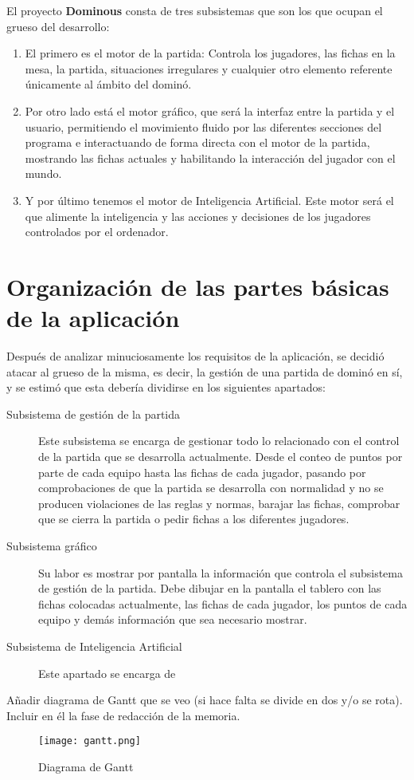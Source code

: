 El proyecto \textbf{Dominous} consta de tres subsistemas que son los que ocupan el grueso del desarrollo:
\begin{enumerate}
    \item El primero es el motor de la partida: Controla los jugadores, las fichas en la mesa, la partida, situaciones irregulares
            y cualquier otro elemento referente únicamente al ámbito del dominó.
    \item Por otro lado está el motor gráfico, que será la interfaz entre la partida y el usuario, permitiendo el movimiento
            fluido por las diferentes secciones del programa e interactuando de forma directa con el motor de la partida,
            mostrando las fichas actuales y habilitando la interacción del jugador con el mundo.
    \item Y por último tenemos el motor de Inteligencia Artificial. Este motor será el que alimente la inteligencia
            y las acciones y decisiones de los jugadores controlados por el ordenador.
\end{enumerate}

\section{Organización de las partes básicas de la aplicación}

Después de analizar minuciosamente los requisitos de la aplicación, se decidió atacar al grueso de la misma,
es decir, la gestión de una partida de dominó en sí, y se estimó que esta debería dividirse en los siguientes
apartados:
\begin{description}
    \item[Subsistema de gestión de la partida] Este subsistema se encarga de gestionar todo lo relacionado
            con el control de la partida que se desarrolla actualmente. Desde el conteo de puntos por parte
            de cada equipo hasta las fichas de cada jugador, pasando por comprobaciones de que la partida
            se desarrolla con normalidad y no se producen violaciones de las reglas y normas, barajar las
            fichas, comprobar que se cierra la partida o pedir fichas a los diferentes jugadores.
    \item[Subsistema gráfico] Su labor es mostrar por pantalla la información que controla el subsistema
            de gestión de la partida. Debe dibujar en la pantalla el tablero con las fichas colocadas
            actualmente, las fichas de cada jugador, los puntos de cada equipo y demás información que
            sea necesario mostrar.
    \item[Subsistema de Inteligencia Artificial] Este apartado se encarga de 
\end{description}

Añadir diagrama de Gantt que se veo (si hace falta se divide en dos y/o se rota). Incluir en él la fase de redacción de la memoria.

\begin{figure}[h]
  \label{logo-sdl}
  \begin{center}
    \texttt{[image: gantt.png]}
  \end{center}
  \caption{Diagrama de Gantt}
\end{figure}

